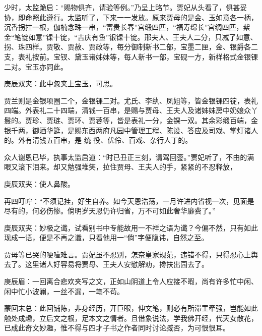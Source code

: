 \begin{parag}
    少时，太监跪启：“赐物俱齐，请验等例。”乃呈上略节。贾妃从头看了，俱甚妥协，即命照此遵行。太监听了，下来一一发放。原来贾母的是金、玉如意各一柄，沉香拐拄一根，伽楠念珠一串，“富贵长春”宫缎四匹，“福寿绵长”宫绸四匹，紫金“笔锭如意”锞十锭，“吉庆有鱼”银锞十锭。邢夫人、王夫人二分，只减了如意、拐、珠四样。贾敬、贾赦、贾政等，每分御制新书二部，宝墨二匣，金、银爵各二支，表礼按前。宝钗、黛玉诸姊妹等，每人新书一部，宝砚一方，新样格式金银锞二对。宝玉亦同此。\begin{note}庚辰双夹：此中忽夹上宝玉，可思。\end{note}贾兰则是金银项圈二个，金银锞二对。尤氏、李纨、凤姐等，皆金银锞四锭，表礼四端。外表礼二十四端，清钱一百串，是赐与贾母、王夫人及诸姊妹房中奶娘众丫鬟的。贾珍、贾琏、贾环、贾蓉等，皆是表礼一分，金锞一双。其余彩缎百端，金银千两，御酒华筵，是赐东西两府凡园中管理工程、陈设、答应及司戏、掌灯诸人的。外有清钱五百串，是 统 役、优伶、百戏、杂行人丁的。
\end{parag}


\begin{parag}
    众人谢恩已毕，执事太监启道：“时已丑正三刻，请驾回銮。”贾妃听了，不由的满眼又滚下泪来。却又勉强堆笑，拉住贾母、王夫人的手，紧紧的不忍释放，\begin{note}庚辰双夹：使人鼻酸。\end{note}再四叮咛：“不须记挂，好生自养。如今天恩浩荡，一月许进内省视一次，见面是尽有的，何必伤惨。倘明岁天恩仍许归省，万不可如此奢华靡费了。”\begin{note}庚辰双夹：妙极之谶，试看别书中专能故用一不祥之语为谶？今偏不然，只有如此现成一语，便是不再之谶，只看他用一“倘”字便隐讳，自然之至。\end{note}贾母等已哭的哽噎难言。贾妃虽不忍别，怎奈皇家规范，违错不得，只得忍心上舆去了。这里诸人好容易将贾母、王夫人安慰解劝，搀扶出园去了。\begin{note}庚辰眉：一回离合悲欢夹写之文，正如山阴道上令人应接不暇，尚有许多忙中闲、闲中忙小波澜，一丝不漏，一笔不苟。\end{note}
\end{parag}


\begin{parag}
    \begin{note}蒙回末总：此回铺陈，非身经历，开巨眼，伸文笔，则必有所滞罣牵强，岂能如此触处成趣，立后文之根，足本文之情者。且借象说法，学我佛开经，代天女散花，已成此奇文妙趣，惟不得与四才子书之作者同时讨论臧否，为可恨恨耳。\end{note}
\end{parag}